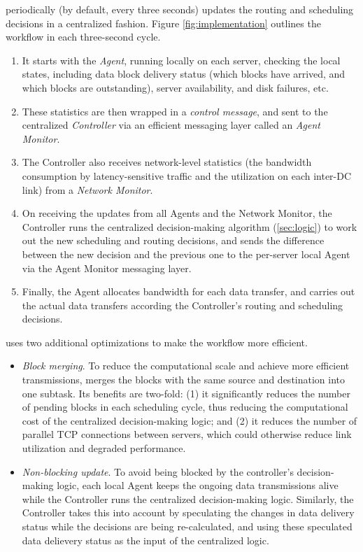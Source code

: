 \name periodically (by default, every three seconds) updates the
routing and scheduling decisions in a centralized fashion.
Figure \ref{fig:implementation} outlines the workflow in each
three-second cycle.
\begin{enumerate}
\item It starts with the {\em Agent}, running locally on each server,
checking the local states, including data block delivery status
(which blocks have arrived, and which blocks are outstanding),
server availability, and disk failures, etc.
\item These statistics are then wrapped in a {\em control message},
and sent to the centralized {\em \name Controller} via an efficient
messaging layer called an {\em Agent Monitor}.
\item The \name Controller also receives network-level statistics
(the bandwidth consumption by latency-sensitive traffic and the
utilization on each inter-DC link) from a {\em Network Monitor}.
\item On receiving the updates from all Agents and the Network
Monitor, the \name Controller runs the centralized decision-making
algorithm (\Section\ref{sec:logic}) to work out the new scheduling
and routing decisions, and sends the difference between the new
decision and the previous one to the per-server local Agent via
the Agent Monitor messaging layer.
\item Finally, the Agent allocates bandwidth for each data transfer,
and carries out the actual data transfers according the Controller's
routing and scheduling decisions.
\end{enumerate}


\name uses two additional optimizations to make the workflow
more efficient.
\begin{itemize}
\item \emph{Block merging}.
To reduce the computational scale and achieve more efficient
transmissions, \name merges the blocks with the same source and
destination into one subtask. Its benefits are two-fold: (1) it
significantly reduces the number of pending blocks in each
scheduling cycle, thus reducing the computational cost of the
centralized decision-making logic; and (2) it reduces the number
of parallel TCP connections between servers, which could
otherwise reduce link utilization and degraded performance.
\item \emph{Non-blocking update}.
To avoid being blocked by the controller's decision-making logic,
each local Agent  keeps the ongoing data transmissions alive while
the Controller runs the centralized decision-making logic.
Similarly, the Controller takes this into account by speculating
the changes in data delivery status while the decisions are being
re-calculated, and using these speculated data delievery status as
the input of the centralized logic.
\end{itemize}

